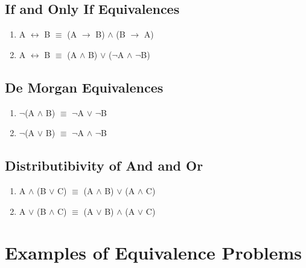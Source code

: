\documentclass{report}
\begin{document}
\subsection{If and Only If Equivalences}
\begin{enumerate}

  \item A $\leftrightarrow$ B $\equiv$ (A $\to$ B) $\land$ (B $\to$ A)
  \item A $\leftrightarrow$ B $\equiv$ (A $\land$ B) $\lor$ ($\neg$A $\land$ $\neg$B)

\end{enumerate}

\subsection{De Morgan Equivalences}

\begin{enumerate}

  \item $\neg$(A $\land$ B) $\equiv$ $\neg$A $\lor$ $\neg$B
  \item $\neg$(A $\lor$ B) $\equiv$ $\neg$A $\land$ $\neg$B

\end{enumerate}

\subsection{Distributibivity of And and Or}
\begin{enumerate}

  \item A $\land$ (B $\lor$ C) $\equiv$ (A $\land$ B) $\lor$ (A $\land$ C)
  \item A $\lor$ (B $\land$ C) $\equiv$ (A $\lor$ B) $\land$ (A $\lor$ C)

\end{enumerate}

\section{Examples of Equivalence Problems}
\end{document}
